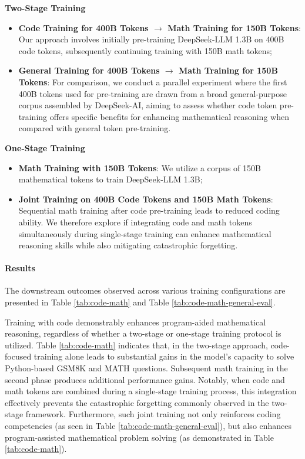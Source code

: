 \begin{itemize}[topsep=0pt]
\begin{itemize}[topsep=0pt]
\textbf{Two-Stage Training}

\begin{itemize}[topsep=0pt]
    \item \textbf{Code Training for 400B Tokens $\rightarrow$ Math Training for 150B Tokens}: Our approach involves initially pre-training DeepSeek-LLM 1.3B on 400B code tokens, subsequently continuing training with 150B math tokens;
    \item \textbf{General Training for 400B Tokens $\rightarrow$ Math Training for 150B Tokens}: For comparison, we conduct a parallel experiment where the first 400B tokens used for pre-training are drawn from a broad general-purpose corpus assembled by DeepSeek-AI, aiming to assess whether code token pre-training offers specific benefits for enhancing mathematical reasoning when compared with general token pre-training.
\end{itemize}

\textbf{One-Stage Training}

\begin{itemize}[topsep=0pt]
    \item \textbf{Math Training with 150B Tokens}: We utilize a corpus of 150B mathematical tokens to train DeepSeek-LLM 1.3B;
    \item \textbf{Joint Training on 400B Code Tokens and 150B Math Tokens}: Sequential math training after code pre-training leads to reduced coding ability. We therefore explore if integrating code and math tokens simultaneously during single-stage training can enhance mathematical reasoning skills while also mitigating catastrophic forgetting.
\end{itemize}

\paragraph{Results}
The downstream outcomes observed across various training configurations are presented in Table \ref{tab:code-math} and Table \ref{tab:code-math-general-eval}.

Training with code demonstrably enhances program-aided mathematical reasoning, regardless of whether a two-stage or one-stage training protocol is utilized. Table \ref{tab:code-math} indicates that, in the two-stage approach, code-focused training alone leads to substantial gains in the model’s capacity to solve Python-based GSM8K and MATH questions. Subsequent math training in the second phase produces additional performance gains. Notably, when code and math tokens are combined during a single-stage training process, this integration effectively prevents the catastrophic forgetting commonly observed in the two-stage framework. Furthermore, such joint training not only reinforces coding competencies (as seen in Table \ref{tab:code-math-general-eval}), but also enhances program-assisted mathematical problem solving (as demonstrated in Table \ref{tab:code-math}).


\end{itemize}
\end{itemize}
